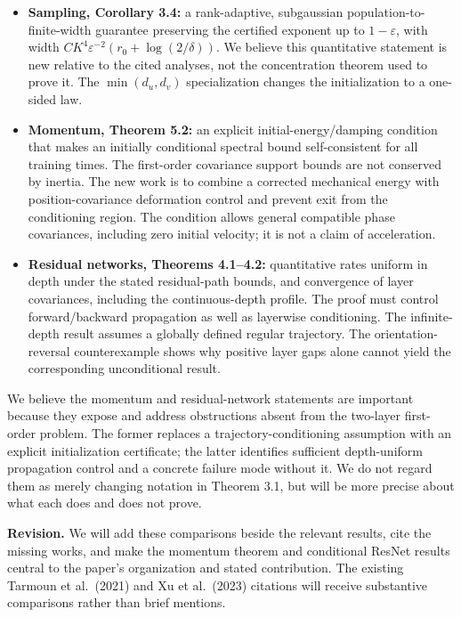 \documentclass[11pt,a4paper]{article}
\providecommand{\tightlist}{}
\begin{document}
\begin{itemize}
\tightlist
\item
  \textbf{Sampling, Corollary 3.4:} a rank-adaptive, subgaussian population-to-finite-width guarantee preserving the certified exponent up to \(1-\varepsilon\), with width \(CK^4\varepsilon^{-2}(r_0+\log(2/\delta))\). We believe this quantitative statement is new relative to the cited analyses, not the concentration theorem used to prove it. The \(\min(d_u,d_v)\) specialization changes the initialization to a one-sided law.
\item
  \textbf{Momentum, Theorem 5.2:} an explicit initial-energy/damping condition that makes an initially conditional spectral bound self-consistent for all training times. The first-order covariance support bounds are not conserved by inertia. The new work is to combine a corrected mechanical energy with position-covariance deformation control and prevent exit from the conditioning region. The condition allows general compatible phase covariances, including zero initial velocity; it is not a claim of acceleration.
\item
  \textbf{Residual networks, Theorems 4.1--4.2:} quantitative rates uniform in depth under the stated residual-path bounds, and convergence of layer covariances, including the continuous-depth profile. The proof must control forward/backward propagation as well as layerwise conditioning. The infinite-depth result assumes a globally defined regular trajectory. The orientation-reversal counterexample shows why positive layer gaps alone cannot yield the corresponding unconditional result.
\end{itemize}

We believe the momentum and residual-network statements are important because they expose and address obstructions absent from the two-layer first-order problem. The former replaces a trajectory-conditioning assumption with an explicit initialization certificate; the latter identifies sufficient depth-uniform propagation control and a concrete failure mode without it. We do not regard them as merely changing notation in Theorem 3.1, but will be more precise about what each does and does not prove.

\textbf{Revision.} We will add these comparisons beside the relevant results, cite the missing works, and make the momentum theorem and conditional ResNet results central to the paper's organization and stated contribution. The existing Tarmoun et al.~(2021) and Xu et al.~(2023) citations will receive substantive comparisons rather than brief mentions.
\end{document}
